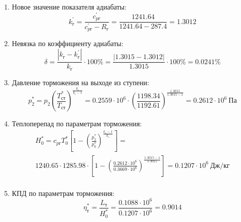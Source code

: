 \documentclass[a4paper,10pt]{article}
\begin{document}
\begin{enumerate}
        \item Новое значение показателя адиабаты:
        \[
            k_г^\prime = \frac{c_{pг}^\prime}{c_{pг}^\prime - R_г} =
                \frac{
                    1241.64
                }{
                    1241.64 - 287.4
                }
            = 1.3012
        \]

        \item Невязка по коэффициенту адиабаты:
        \[
            \delta = \frac{ \left| k_г - k_г^\prime \right| }{ k_г } \cdot 100 \%=
                \frac{
                    \left| 1.3015 - 1.3012 \right|
                }{
                    1.3015
                } \cdot 100 \% =
            0.0241 \%
        \]

        \item Давление торможения на выходе из ступени:
        \[
            p_2^* = p_2 \left(
                            \frac{ T_{ст}^* }{ T_{ст} }
                    \right) ^ \frac{ k_г }{ k_г - 1 } =
                 0.2559 \cdot 10^6 \cdot \left(
                            \frac{ 1198.34 }{ 1192.61 }
                    \right) ^
                \frac{ 1.3015 }{ 1.3015 - 1 } =
            0.2612 \cdot 10^6 \ Па
        \]

        \item Теплоперепад по параметрам торможения:
        \begin{gather*}
            H_0^* = c_{pг} T_0^* \left[
                        1 - \left(
                                \frac{p_2^*}{p_0^*}
                            \right) ^
                        \frac{k_г - 1}{k_г}
                    \right] =\\
            1240.65 \cdot 1285.98 \cdot
                    \left[
                        1 - \left(
                                \frac{
                                    0.2612 \cdot 10^6
                                }{
                                    0.3669 \cdot 10^6
                                }
                            \right) ^
                        \frac{1.3015 - 1}{1.3015}
                    \right]
            = 0.1207 \cdot 10^6 \ Дж/кг\\
        \end{gather*}

        \item КПД по параметрам торможения:
        \[
            \eta_т^* = \frac{ L_т }{ H_0^* } =
                \frac{
                    0.1088 \cdot 10^6
                }{
                    0.1207 \cdot 10^6 } =
            0.9014
        \]


\end{enumerate}
\end{document}
